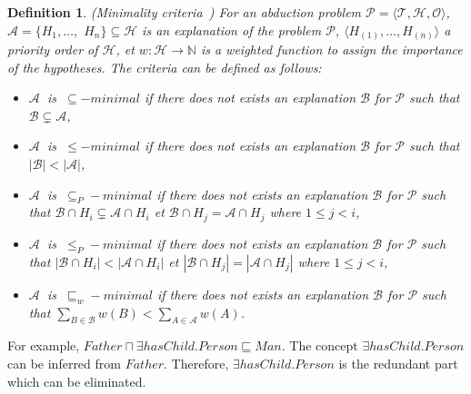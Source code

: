\documentclass{article}
\newtheorem{mydef}{Definition}
\newcommand\abs[1]{\left\lvert #1 \right\rvert}
\begin{document}
\begin{mydef}{(Minimality criteria~\cite{bienvenu08complexity})}
For an abduction problem $\mathcal{P}=\langle \mathcal{T},\mathcal{H}, \mathcal{O}\rangle$,$\mathcal{A}=\{H_1,\dots,$ $H_n \} \subseteq \mathcal{H}$ is an explanation of the problem $\mathcal{P}$,
$\langle H_{(1)},\dots,H_{(n)}\rangle$ a priority order of  $\mathcal{H}$,
et $w:\mathcal{H}\rightarrow \mathbb{N}$ is a weighted function to assign the importance of the hypotheses. The criteria can be defined as follows:
\begin{itemize}
\item  $\mathcal{A}~$ is  $~\subseteq -minimal$ if there does not exists an explanation $\mathcal{B}$ for $\mathcal{P}$ such that $\mathcal{B} \subsetneq \mathcal{A}$,
\item  $\mathcal{A}~$ is  $~\leq -minimal$ if there does not exists an explanation $\mathcal{B}$ for $\mathcal{P}$ such that $\abs{\mathcal{B}} < \abs{\mathcal{A}}$,
\item  $\mathcal{A}~$ is  $~\subseteq_P -minimal$ if there does not exists an explanation $\mathcal{B}$ for $\mathcal{P}$ such that $\mathcal{B} \cap H_i \subsetneq \mathcal{A}\cap H_i$ et
$\mathcal{B} \cap H_j = \mathcal{A}\cap H_j$ where $1\leq j< i$,
\item  $\mathcal{A}~$ is  $~\leq_P -minimal$ if there does not exists an explanation $\mathcal{B}$ for $\mathcal{P}$ such that $\abs{\mathcal{B} \cap H_i} < \abs{\mathcal{A}\cap H_i}$ et
$\abs{\mathcal{B} \cap H_j} = \abs{\mathcal{A}\cap H_j}$ where $1\leq j< i$,
\item  $\mathcal{A}~$ is  $~\sqsubseteq_w -minimal$ if there does not exists an explanation $\mathcal{B}$ for $\mathcal{P}$ such that $\sum_{B \in \mathcal{B}}w(B) < \sum_{A \in \mathcal{A}}w(A)$.
\end{itemize}
 \end{mydef}



For example, $Father \sqcap \exists hasChild.Person \sqsubseteq Man$. The concept $\exists hasChild.Person$ can be inferred from $Father$.
Therefore, $\exists hasChild.Person$ is the redundant part which can be eliminated. 
 

\end{document}

